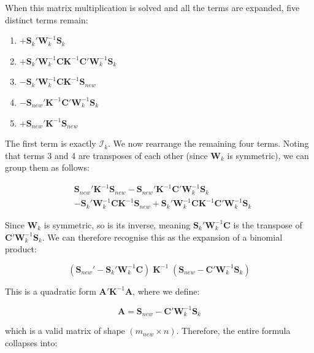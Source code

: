 \documentclass[sn-basic,Numbered,iicol]{sn-jnl}
\theoremstyle{thmstyleone}%
\theoremstyle{thmstyletwo}%
\theoremstyle{thmstylethree}%
\begin{document}
When this matrix multiplication is solved and all the terms are expanded, five distinct terms remain:

\begin{enumerate}
\item $+ \mathbf{S}_k' \mathbf{W}_k^{-1} \mathbf{S}_k$
\item $+ \mathbf{S}_k' \mathbf{W}_k^{-1} \mathbf{C} \mathbf{K}^{-1} \mathbf{C}' \mathbf{W}_k^{-1} \mathbf{S}_k$
\item $- \mathbf{S}_k' \mathbf{W}_k^{-1} \mathbf{C} \mathbf{K}^{-1} \mathbf{S}_{new}$
\item $- \mathbf{S}_{new}' \mathbf{K}^{-1} \mathbf{C}' \mathbf{W}_k^{-1} \mathbf{S}_k$
\item $+ \mathbf{S}_{new}' \mathbf{K}^{-1} \mathbf{S}_{new}$
\end{enumerate}

The first term is exactly $\mathcal{I}_k$. We now rearrange the remaining four terms. Noting that terms 3 and 4 are transposes of each other (since $\mathbf{W}_k$ is symmetric), we can group them as follows:

\begin{align}
&\mathbf{S}_{new}' \mathbf{K}^{-1} \mathbf{S}_{new} - \mathbf{S}_{new}' \mathbf{K}^{-1} \mathbf{C}' \mathbf{W}_k^{-1} \mathbf{S}_k \nonumber \\
&- \mathbf{S}_k' \mathbf{W}_k^{-1} \mathbf{C} \mathbf{K}^{-1} \mathbf{S}_{new} + \mathbf{S}_k' \mathbf{W}_k^{-1} \mathbf{C} \mathbf{K}^{-1} \mathbf{C}' \mathbf{W}_k^{-1} \mathbf{S}_k
\end{align}

Since $\mathbf{W}_k$ is symmetric, so is its inverse, meaning $\mathbf{S}_k'\mathbf{W}_k^{-1}\mathbf{C}$ is the transpose of $\mathbf{C}'\mathbf{W}_k^{-1}\mathbf{S}_k$. We can therefore recognise this as the expansion of a binomial product:

\begin{equation}
(\mathbf{S}_{new}' - \mathbf{S}_k'\mathbf{W}_k^{-1}\mathbf{C}) \; \mathbf{K}^{-1} \; (\mathbf{S}_{new} - \mathbf{C}'\mathbf{W}_k^{-1}\mathbf{S}_k)
\end{equation}

This is a quadratic form $\mathbf{A}'\mathbf{K}^{-1}\mathbf{A}$, where we define:

\begin{equation}
\mathbf{A} = \mathbf{S}_{new} - \mathbf{C}'\mathbf{W}_k^{-1}\mathbf{S}_k
\end{equation}

which is a valid matrix of shape $(m_{new} \times n)$. Therefore, the entire formula collapses into:
\end{document}
